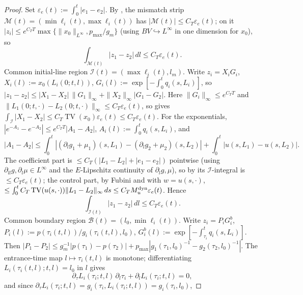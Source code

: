 \documentclass[a4paper,fleqn,longmktitle]{cas-sc}
\theoremstyle{plain}
\theoremstyle{definition}
\theoremstyle{remark}
\numberwithin{equation}{section}
\begin{document}
\begin{proof}
Set \(\varepsilon_e(t):=\int_0^t|e_1-e_2|\). By ,
the mismatch strip
\(\mathcal M(t)=(\min\ell_i(t),\max\ell_i(t))\) has
\(|\mathcal M(t)|\le C_T\varepsilon_e(t)\); on it
\(|z_i|\le e^{C_TT}\max\{\|x_0\|_{L^\infty},p_{\max}/g_m\}\) (using
\(BV\hookrightarrow L^\infty\) in one dimension for \(x_0\)), so
\begin{equation}
    \label{eq:app_mismatch_estimate}
    \int_{\mathcal M(t)}|z_1-z_2|\,dl\le C_T\varepsilon_e(t).
\end{equation}
Common initial-line region \(\mathcal I(t)=(\max\ell_i(t),l_m)\). Write
\(z_i=X_iG_i\), \(X_i(l):=x_0(L_i(0;t,l))\),
\(G_i(l):=\exp[-\int_0^t q_i(s,L_i)]\), so
\(|z_1-z_2|\le|X_1-X_2|\,\|G_1\|_\infty+\|X_2\|_\infty|G_1-G_2|\). Here
\(\|G_i\|_\infty\le e^{C_TT}\) and
\(\|L_1(0;t,\cdot)-L_2(0;t,\cdot)\|_\infty\le C_T\varepsilon_e(t)\), so
 gives
\(\int_{\mathcal I}|X_1-X_2|\le C_T\operatorname{TV}(x_0)\varepsilon_e(t)\le
C_T\varepsilon_e(t)\). For the exponentials, \(|e^{-A_1}-e^{-A_2}|\le
e^{C_TT}|A_1-A_2|\), \(A_i(l):=\int_0^t q_i(s,L_i)\), and
\[
    |A_1-A_2|
    \le
    \int_0^t|(\partial_lg_1+\mu_1)(s,L_1)-(\partial_lg_2+\mu_2)(s,L_2)|
    +
    \int_0^t|u(s,L_1)-u(s,L_2)|.
\]
The coefficient part is \(\le C_T(|L_1-L_2|+|e_1-e_2|)\) pointwise (using
\(\partial_{ll}g,\partial_l\mu\in L^\infty\) and the \(E\)-Lipschitz continuity
of \(\partial_lg,\mu\)), so by  its
\(\mathcal I\)-integral is \(\le C_T\varepsilon_e(t)\); the control part, by
Fubini and  with \(w=u(s,\cdot)\),
\(\le\int_0^t C_T\operatorname{TV}(u(s,\cdot))\|L_1-L_2\|_\infty\,ds\le
C_T M_u^{\rm dyn}\varepsilon_e(t)\). Hence
\begin{equation}
    \label{eq:app_initial_region_estimate}
    \int_{\mathcal I(t)}|z_1-z_2|\,dl\le C_T\varepsilon_e(t).
\end{equation}
Common boundary region \(\mathcal B(t)=(l_0,\min\ell_i(t))\). Write
\(z_i=P_iG_i^b\), \(P_i(l):=p(\tau_i(t,l))/g_i(\tau_i(t,l),l_0)\),
\(G_i^b(l):=\exp[-\int_{\tau_i}^t q_i(s,L_i)]\). Then
\(|P_1-P_2|\le g_m^{-1}|p(\tau_1)-p(\tau_2)|+p_{\max}|g_1(\tau_1,l_0)^{-1}-g_2(\tau_2,l_0)^{-1}|\).
The entrance-time map \(l\mapsto\tau_i(t,l)\) is monotone; differentiating
\(L_i(\tau_i(t,l);t,l)=l_0\) in \(l\) gives
\[
    \partial_\tau L_i(\tau_i;t,l)\,\partial_l\tau_i
    +
    \partial_l L_i(\tau_i;t,l)=0,
\]
and since \(\partial_\tau L_i(\tau_i;t,l)=g_i(\tau_i,L_i(\tau_i;t,l))=g_i(\tau_i,l_0)\),

\end{proof}
\end{document}
